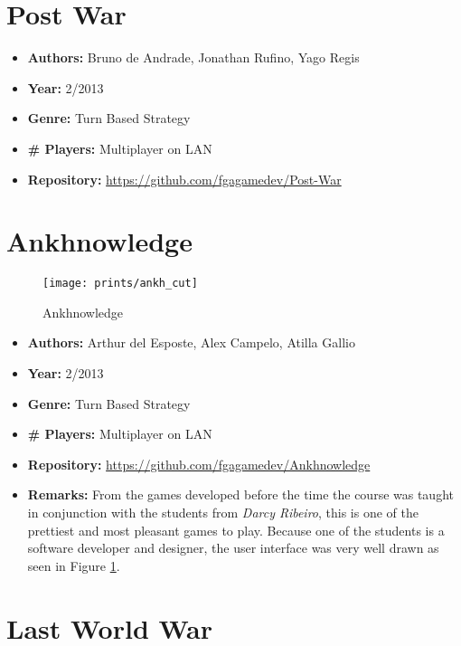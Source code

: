 \begin{apendicesenv}
\section{Post War}
\label {sec:post_war}

\begin{itemize}
\item[] \textbf{Authors:} Bruno de Andrade, Jonathan Rufino, Yago Regis
\item[] \textbf{Year:} 2/2013
\item[] \textbf{Genre:} Turn Based Strategy
\item[] \textbf{\# Players:} Multiplayer on LAN
\item[] \textbf{Repository:} \url{https://github.com/fgagamedev/Post-War}
\end{itemize}

\section{Ankhnowledge}
\label {sec:ankh}


\begin{figure}[h!]
\centering
\texttt{[image: prints/ankh\_cut]}
\caption{Ankhnowledge}
\label{fig:ankh}
\end{figure}

\begin{itemize}
\item[] \textbf{Authors:} Arthur del Esposte, Alex Campelo, Atilla Gallio
\item[] \textbf{Year:} 2/2013
\item[] \textbf{Genre:} Turn Based Strategy
\item[] \textbf{\# Players:} Multiplayer on LAN
\item[] \textbf{Repository:} \url{https://github.com/fgagamedev/Ankhnowledge}
\item[] \textbf{Remarks:} From the games developed before the time the course was taught in conjunction with the students from \textit{Darcy Ribeiro}, this is one of the prettiest and most pleasant games to play. Because one of the students is a software developer and designer, the user interface was very well drawn as seen in Figure \ref{fig:ankh}.
\end{itemize}


\section{Last World War}
\label {sec:last_world_war}



\end{apendicesenv}
